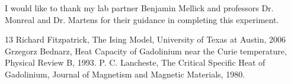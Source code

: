 \documentclass[%
reprint,
amsmath,amssymb,
aps,
]{revtex4-2}
\begin{document}
	
	
	
	

	
	
	
	
	\begin{acknowledgments}
	I would like to thank my lab partner Benjamin Mellick and professors Dr. Monreal and Dr. Martens for their guidance in completing this experiment.  
	\end{acknowledgments}
	
	
	\begin{thebibliography}{13} %
	 Richard Fitzpatrick, The Ising Model, University of Texas at Austin, 2006
	 Grzegorz Bednarz, Heat Capacity of Gadolinium near the Curie temperature, Physical Review B,  1993.
	 P. C. Lancheste, The Critical Specific Heat of Gadolinium, Journal of Magnetism and Magnetic Materials, 1980.
	\end{thebibliography}
	
	
	
\end{document}
